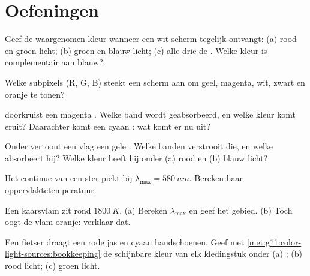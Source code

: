 \section{Oefeningen}

\begin{exercise}[$\star$]\label{exo:g11:color-light-sources:1}
Geef de waargenomen kleur wanneer een wit scherm tegelijk ontvangt:
(a) rood en groen licht; (b) groen en blauw licht; (c) alle drie de
. Welke kleur is complementair aan blauw?
\end{exercise}

\begin{exercise}[$\star$]\label{exo:g11:color-light-sources:2}
Welke subpixels (R, G, B) steekt een scherm aan om geel, magenta, wit,
zwart en oranje te tonen?
\end{exercise}

\begin{exercise}[$\star$]\label{exo:g11:color-light-sources:3}
 doorkruist een magenta . Welke band wordt geabsorbeerd,
en welke kleur komt eruit? Daarachter komt een cyaan : wat komt er
nu uit?
\end{exercise}

\begin{exercise}[$\star$]\label{exo:g11:color-light-sources:4}
Onder  vertoont een vlag een gele . Welke banden verstrooit
die, en welke absorbeert hij? Welke kleur heeft hij onder (a) rood en
(b) blauw licht?
\end{exercise}

\begin{exercise}[$\star$]\label{exo:g11:color-light-sources:5}
Het continue  van een ster piekt bij
$\lambda_{\max} = \qty{580}{nm}$. Bereken haar oppervlaktetemperatuur.
\end{exercise}

\begin{exercise}[$\star\star$]\label{exo:g11:color-light-sources:6}
Een kaarsvlam zit rond $\qty{1800}{K}$. (a) Bereken $\lambda_{\max}$ en
geef het gebied. (b) Toch oogt de vlam oranje: verklaar dat.
\end{exercise}

\begin{exercise}[$\star\star$]\label{exo:g11:color-light-sources:7}
Een fietser draagt een rode jas en cyaan handschoenen. Geef met
\cref{met:g11:color-light-sources:bookkeeping} de schijnbare kleur van
elk kledingstuk onder (a) ; (b) rood licht; (c) groen licht.
\end{exercise}

